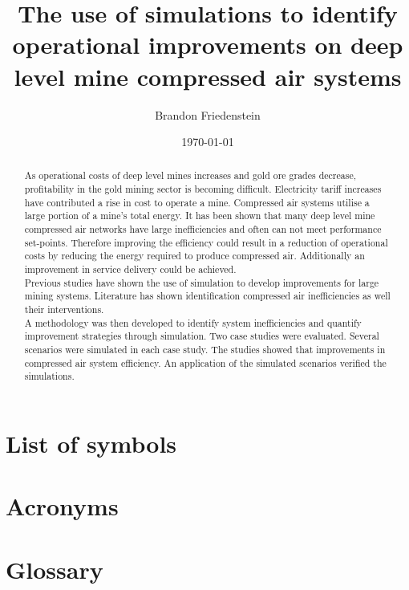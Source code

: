 \documentclass[12pt, english, oneside, singlespacing, open=any]{report}
\begin{document}
	
\begin{titlepage}
	\title{The use of simulations to identify
		operational improvements on deep level mine compressed
		air systems}
	\date{\today}
	\author{Brandon Friedenstein}
	\maketitle
\end{titlepage}

\begin{abstract}
	\thispagestyle{plain}
	\setcounter{page}{2}
	
	 As operational costs of deep level mines increases and gold ore grades decrease, profitability in the gold mining sector is becoming difficult. Electricity tariff increases have contributed a rise in cost to operate a mine.  Compressed air systems utilise a large portion of a mine's total energy. It has been shown that many deep level mine compressed air networks have large inefficiencies and often can not meet performance set-points. Therefore improving the efficiency could result in a reduction of operational costs by reducing the energy required to produce compressed air. Additionally an improvement in service delivery could be achieved. \\
	Previous studies have shown the use of simulation to develop improvements for large mining systems. Literature has shown identification compressed  air inefficiencies as well their interventions.\\
	A methodology was then developed to identify system inefficiencies and quantify improvement strategies through simulation. Two case studies were evaluated. Several scenarios  were simulated in each case study. The studies showed that improvements in compressed air system efficiency. An application of the simulated scenarios verified the simulations. 
	
\end{abstract}

\setcounter{page}{3}
\tableofcontents

\chapter*{List of symbols}

\chapter*{Acronyms}

\chapter*{Glossary}









\end{document}
